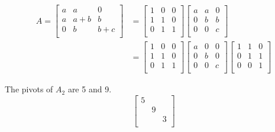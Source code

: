 \documentclass[a4paper]{article}
\begin{document}
\begin{align*}
	A =
	\begin{bmatrix}
		a & a & 0 \\
		a & a + b & b \\
		0 & b & b + c \\
	\end{bmatrix}
	& =
	\begin{bmatrix}
		1 & 0 & 0 \\
		1 & 1 & 0 \\
		0 & 1 & 1 \\
	\end{bmatrix}
	\begin{bmatrix}
		a & a & 0 \\
		0 & b & b \\
		0 & 0 & c \\
	\end{bmatrix} \\
	& = 
	\begin{bmatrix}
		1 & 0 & 0 \\
		1 & 1 & 0 \\
		0 & 1 & 1 \\
	\end{bmatrix}
	\begin{bmatrix}
		a & 0 & 0 \\
		0 & b & 0 \\
		0 & 0 & c \\
	\end{bmatrix}
	\begin{bmatrix}
		1 & 1 & 0 \\
		0 & 1 & 1 \\
		0 & 0 & 1 \\
	\end{bmatrix}
\end{align*}


The pivots of \(A_{2}\) are 5 and 9.
\[
	\begin{bmatrix}
		\boxed{5} &  &  \\
		 & \boxed{9} &  \\
		 &  & 3 \\
	\end{bmatrix}
\]
\end{document}
